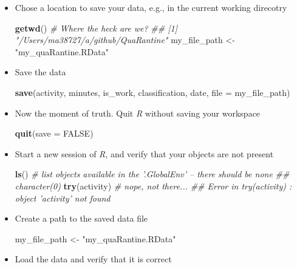 \documentclass[]{book}
\newenvironment{Shaded}{\begin{snugshade}}{\end{snugshade}}
\newcommand{\CommentTok}[1]{\textcolor[rgb]{0.56,0.35,0.01}{\textit{#1}}}
\newcommand{\DataTypeTok}[1]{\textcolor[rgb]{0.13,0.29,0.53}{#1}}
\newcommand{\KeywordTok}[1]{\textcolor[rgb]{0.13,0.29,0.53}{\textbf{#1}}}
\newcommand{\NormalTok}[1]{#1}
\newcommand{\OtherTok}[1]{\textcolor[rgb]{0.56,0.35,0.01}{#1}}
\newcommand{\StringTok}[1]{\textcolor[rgb]{0.31,0.60,0.02}{#1}}
\begin{document}
\begin{itemize}
\item
  Chose a location to save your data, e.g., in the current working direcotry

\begin{Shaded}
\begin{Highlighting}[]
\KeywordTok{getwd}\NormalTok{()    }\CommentTok{# Where the heck are we?}
\CommentTok{## [1] "/Users/ma38727/a/github/QuaRantine"}
\NormalTok{my_file_path <-}\StringTok{ "my_quaRantine.RData"}
\end{Highlighting}
\end{Shaded}
\item
  Save the data

\begin{Shaded}
\begin{Highlighting}[]
\KeywordTok{save}\NormalTok{(activity, minutes, is_work, classification, date, }\DataTypeTok{file =}\NormalTok{ my_file_path)}
\end{Highlighting}
\end{Shaded}
\item
  Now the moment of truth. Quit \emph{R} without saving your workspace

\begin{Shaded}
\begin{Highlighting}[]
\KeywordTok{quit}\NormalTok{(}\DataTypeTok{save =} \OtherTok{FALSE}\NormalTok{)}
\end{Highlighting}
\end{Shaded}
\item
  Start a new session of \emph{R}, and verify that your objects are not present

\begin{Shaded}
\begin{Highlighting}[]
\KeywordTok{ls}\NormalTok{() }\CommentTok{# list objects available in the '.GlobalEnv' -- there should be none}
\CommentTok{## character(0)}
\KeywordTok{try}\NormalTok{(activity) }\CommentTok{# nope, not there...}
\CommentTok{## Error in try(activity) : object 'activity' not found}
\end{Highlighting}
\end{Shaded}
\item
  Create a path to the saved data file

\begin{Shaded}
\begin{Highlighting}[]
\NormalTok{my_file_path <-}\StringTok{ "my_quaRantine.RData"}
\end{Highlighting}
\end{Shaded}
\item
  Load the data and verify that it is correct


\end{itemize}
\end{document}
